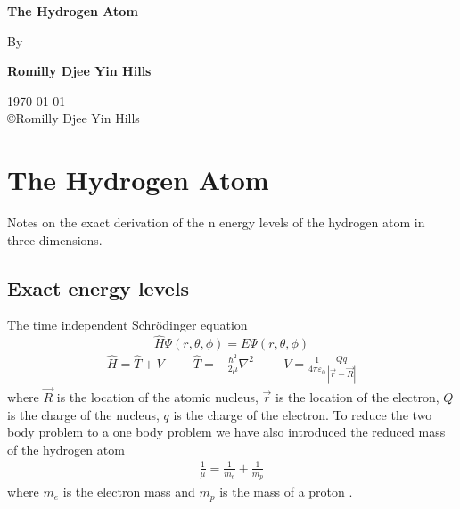 \documentclass[12pt,a4paper]{report}
\begin{document}
\begin{titlepage}
	\begin{center}
		\large
		\vspace*{1cm}
        		
 		\textbf{The Hydrogen Atom}
        
		\vspace{0.5cm}
		By
        
		\vspace{1.5cm}
        
		\textbf{Romilly Djee Yin Hills}\\

		\vspace{1.5cm}

		\today \\
		\copyright Romilly Djee Yin Hills\\
        
	\end{center}
\end{titlepage}


\chapter{The Hydrogen Atom}
\label{The Hydrogen Atom}

Notes on the exact derivation of the n energy levels of the hydrogen atom in three dimensions.


\section{Exact energy levels}
\label{section_exact}
	The time independent Schr{\"o}dinger equation
	\begin{equation}
		\label{tise}
		\hat{H} \Psi \left( r,\theta,\phi \right) = E \Psi \left( r,\theta,\phi \right)
	\end{equation}
	\begin{align}
		\label{tise_definitions}
		\hat{H} = \hat{T} + V \hspace{1cm} \hat{T} = -\frac{\hbar^2}{2\mu}\nabla^2 \hspace{1cm} V = \frac{1}{4\pi\varepsilon_0}\frac{Qq}{|\vec{r}-\vec{R}|}
	\end{align}
	where $\vec{R}$ is the location of the atomic nucleus, $\vec{r}$ is the location of the electron, $Q$ is the charge of the nucleus, $q$ is the charge of the electron. To reduce the two body problem to a one body problem we have also introduced the reduced mass of the hydrogen atom
	\begin{align}
		\frac{1}{\mu} = \frac{1}{m_e}+\frac{1}{m_p}
	\end{align}
	where $m_e$ is the electron mass and $m_p$ is the mass of a proton \cite{Abramowitz and Stegun 7}.
\end{document}
